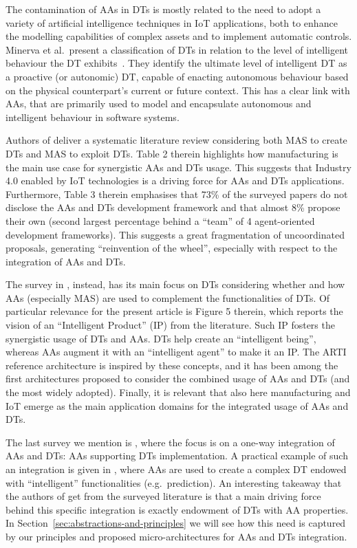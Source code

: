 The contamination of AAs in DTs is mostly related to the need to adopt a variety of artificial intelligence techniques in IoT applications, both to enhance the modelling capabilities of complex assets and to implement automatic controls.
Minerva et al.\ present a classification of DTs in relation to the level of intelligent behaviour the DT exhibits~\cite{Minerva2023}.
They identify the ultimate level of intelligent DT as a proactive (or autonomic) DT, capable of enacting autonomous behaviour based on the physical counterpart's current or future context.
This has a clear link with AAs, that are primarily used to model and encapsulate autonomous and intelligent behaviour in software systems.

Authors of \cite{Pretel2024} deliver a systematic literature review considering both MAS to create DTs and MAS to exploit DTs. 
Table 2 therein highlights how manufacturing is the main use case for synergistic AAs and DTs usage. 
This suggests that Industry 4.0 enabled by IoT technologies is a driving force for AAs and DTs applications. 
Furthermore, Table 3 therein emphasises that 73\% of the surveyed papers do not disclose the AAs and DTs development framework 
and that almost 8\% propose their own 
    (second largest percentage behind a ``team'' of 4 agent-oriented development frameworks). 
This suggests a great fragmentation of uncoordinated proposals, 
generating ``reinvention of the wheel'', especially with respect to the integration of AAs and DTs.

The survey in \cite{10.1115/1.4050244}, instead, has its main focus on DTs considering whether and how AAs (especially MAS) are used to complement the functionalities of DTs. 
Of particular relevance for the present article is Figure 5 therein, 
which reports the vision of an ``Intelligent Product'' (IP) from the literature. 
Such IP fosters the synergistic usage of DTs and AAs. 
DTs help create an ``intelligent being'', 
whereas AAs augment it with an ``intelligent agent'' to make it an IP. 
The ARTI reference architecture is inspired by these concepts, 
and it has been among the first architectures proposed to consider 
the combined usage of AAs and DTs (and the most widely adopted). 
Finally, it is relevant that also here manufacturing and IoT emerge as the main application domains for the integrated usage of AAs and DTs.

The last survey we mention is \cite{Kalyani2025}, 
where the focus is on a one-way integration of AAs and DTs: 
AAs supporting DTs implementation. 
A practical example of such an integration is given in \cite{Latsou2021811}, 
where AAs are used to create a complex DT endowed with ``intelligent'' functionalities (e.g.\ prediction). 
An interesting takeaway that the authors of \cite{Kalyani2025} get from the surveyed literature 
is that a main driving force behind this specific integration is exactly endowment of DTs with AA properties. 
In Section~\ref{sec:abstractions-and-principles} we will see how this need is captured by our principles and proposed micro-architectures for AAs and DTs integration.

